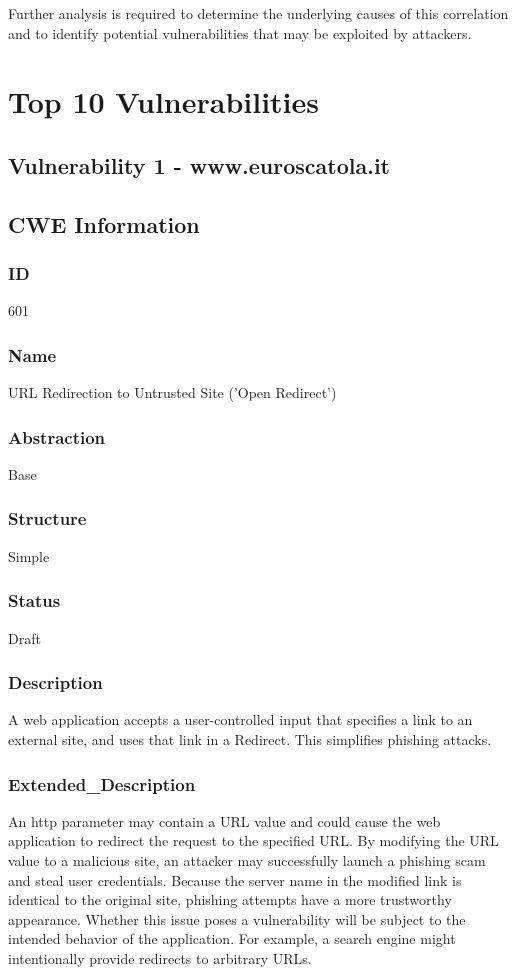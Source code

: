 Further analysis is required to determine the underlying causes of this correlation and to identify potential vulnerabilities that may be exploited by attackers.



\chapter{Top 10 Vulnerabilities}

\section*{Vulnerability 1 - www.euroscatola.it}

\section*{CWE Information}
\subsection*{ID}
601

\subsection*{Name}
URL Redirection to Untrusted Site ('Open Redirect')

\subsection*{Abstraction}
Base

\subsection*{Structure}
Simple

\subsection*{Status}
Draft

\subsection*{Description}
A web application accepts a user-controlled input that specifies a link to an external site, and uses that link in a Redirect. This simplifies phishing attacks.

\subsection*{Extended\_Description}
An http parameter may contain a URL value and could cause the web application to redirect the request to the specified URL. By modifying the URL value to a malicious site, an attacker may successfully launch a phishing scam and steal user credentials. Because the server name in the modified link is identical to the original site, phishing attempts have a more trustworthy appearance. Whether this issue poses a vulnerability will be subject to the intended behavior of the application. For example, a search engine might intentionally provide redirects to arbitrary URLs.

